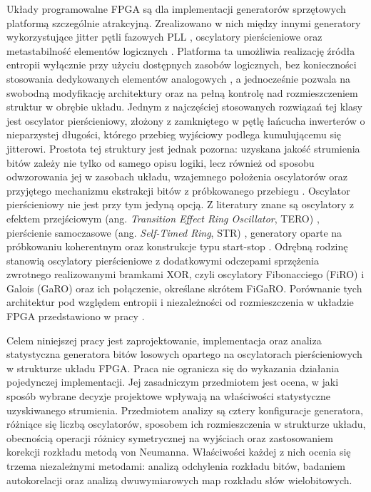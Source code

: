 Układy programowalne FPGA są dla implementacji generatorów sprzętowych platformą
szczególnie atrakcyjną. Zrealizowano w nich między innymi generatory wykorzystujące jitter
pętli fazowych PLL \cite{fischer2002true}, oscylatory pierścieniowe
\cite{sunar2007provably,schellekens2006fpga,wold2009analysis} oraz metastabilność
elementów logicznych \cite{majzoobi2011fpga}. Platforma ta umożliwia realizację źródła
entropii wyłącznie przy użyciu dostępnych zasobów logicznych, bez konieczności stosowania
dedykowanych elementów analogowych \cite{schellekens2006fpga}, a jednocześnie pozwala na
swobodną modyfikację architektury oraz na pełną kontrolę nad rozmieszczeniem struktur
w obrębie układu. Jednym z najczęściej stosowanych rozwiązań tej klasy jest oscylator
pierścieniowy, złożony z zamkniętego w pętlę łańcucha inwerterów o nieparzystej długości,
którego przebieg wyjściowy podlega kumulującemu się jitterowi. Prostota tej struktury
jest jednak pozorna: uzyskana jakość strumienia bitów zależy nie tylko od samego opisu
logiki, lecz również od sposobu odwzorowania jej w zasobach układu, wzajemnego położenia
oscylatorów oraz przyjętego mechanizmu ekstrakcji bitów z próbkowanego przebiegu
\cite{nannipieri2021figaro}. Oscylator pierścieniowy nie jest przy tym jedyną opcją.
Z literatury znane są oscylatory z efektem przejściowym (ang. \emph{Transition Effect
Ring Oscillator}, TERO) \cite{varchola2010new}, pierścienie samoczasowe (ang.
\emph{Self-Timed Ring}, STR) \cite{cherkaoui2013very}, generatory oparte na próbkowaniu
koherentnym \cite{peetermans2019portable} oraz konstrukcje typu start-stop
\cite{matuszewski2024startstop}. Odrębną rodzinę stanowią oscylatory pierścieniowe
z dodatkowymi odczepami sprzężenia zwrotnego realizowanymi bramkami XOR, czyli
oscylatory Fibonacciego (FiRO) i Galois (GaRO) \cite{golic2006new,dichtl2007high} oraz
ich połączenie, określane skrótem FiGaRO. Porównanie tych architektur pod względem
entropii i niezależności od rozmieszczenia w układzie FPGA przedstawiono w pracy
\cite{nannipieri2021figaro}.

Celem niniejszej pracy jest zaprojektowanie, implementacja oraz analiza statystyczna
generatora bitów losowych opartego na oscylatorach pierścieniowych w strukturze układu
FPGA. Praca nie ogranicza się do wykazania działania pojedynczej implementacji. Jej
zasadniczym przedmiotem jest ocena, w jaki sposób wybrane decyzje projektowe wpływają na
właściwości statystyczne uzyskiwanego strumienia. Przedmiotem analizy są cztery
konfiguracje generatora, różniące się liczbą oscylatorów, sposobem ich rozmieszczenia
w strukturze układu, obecnością operacji różnicy symetrycznej na wyjściach oraz
zastosowaniem korekcji rozkładu metodą von Neumanna. Właściwości każdej z nich ocenia się
trzema niezależnymi metodami: analizą odchylenia rozkładu bitów, badaniem autokorelacji
oraz analizą dwuwymiarowych map rozkładu słów wielobitowych.